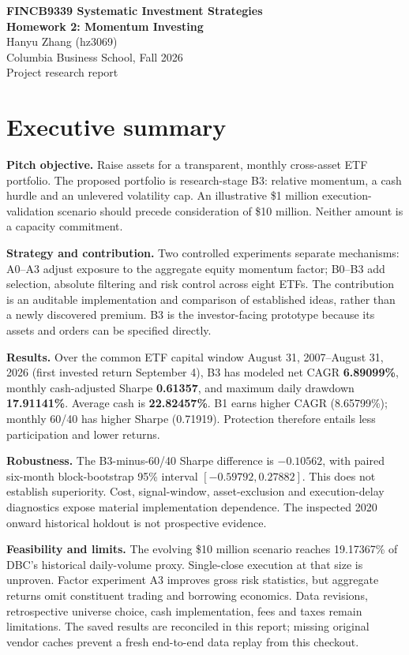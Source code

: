 \documentclass[11pt]{article}
\begin{document}
\begin{center}{\Large\bfseries FINCB9339 Systematic Investment Strategies\\[3pt]Homework 2: Momentum Investing}\\[8pt]
Hanyu Zhang (hz3069)\\Columbia Business School, Fall 2026\\Project research report\end{center}
\section*{Executive summary}
\textbf{Pitch objective.} Raise assets for a transparent, monthly cross-asset ETF portfolio. The proposed portfolio is research-stage B3: relative momentum, a cash hurdle and an unlevered volatility cap. An illustrative \$1 million execution-validation scenario should precede consideration of \$10 million. Neither amount is a capacity commitment.

\textbf{Strategy and contribution.} Two controlled experiments separate mechanisms: A0--A3 adjust exposure to the aggregate equity momentum factor; B0--B3 add selection, absolute filtering and risk control across eight ETFs. The contribution is an auditable implementation and comparison of established ideas, rather than a newly discovered premium. B3 is the investor-facing prototype because its assets and orders can be specified directly.

\textbf{Results.} Over the common ETF capital window August 31, 2007--August 31, 2026 (first invested return September 4), B3 has modeled net CAGR \textbf{6.89099\%}, monthly cash-adjusted Sharpe \textbf{0.61357}, and maximum daily drawdown \textbf{17.91141\%}. Average cash is \textbf{22.82457\%}. B1 earns higher CAGR (8.65799\%); monthly 60/40 has higher Sharpe (0.71919). Protection therefore entails less participation and lower returns.

\textbf{Robustness.} The B3-minus-60/40 Sharpe difference is $-0.10562$, with paired six-month block-bootstrap 95\% interval $[-0.59792,0.27882]$. This does not establish superiority. Cost, signal-window, asset-exclusion and execution-delay diagnostics expose material implementation dependence. The inspected 2020 onward historical holdout is not prospective evidence.

\textbf{Feasibility and limits.} The evolving \$10 million scenario reaches 19.17367\% of DBC's historical daily-volume proxy. Single-close execution at that size is unproven. Factor experiment A3 improves gross risk statistics, but aggregate returns omit constituent trading and borrowing economics. Data revisions, retrospective universe choice, cash implementation, fees and taxes remain limitations. The saved results are reconciled in this report; missing original vendor caches prevent a fresh end-to-end data replay from this checkout.
\clearpage
\end{document}
